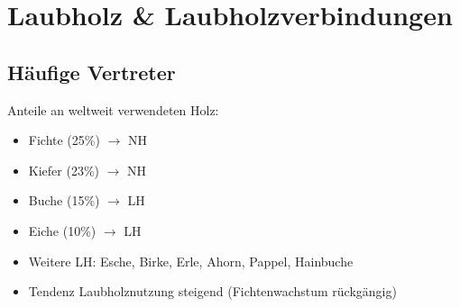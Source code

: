 \documentclass[fleqn,twoside]{article}
\begin{document}
\newpage
\section{Laubholz \& Laubholzverbindungen}

    \subsection{Häufige Vertreter}
        Anteile an weltweit verwendeten Holz:
        \begin{itemize}
            \item Fichte (25\%) $\rightarrow$ NH
            \item Kiefer (23\%) $\rightarrow$ NH
            \item Buche (15\%) $\rightarrow$ LH
            \item Eiche (10\%) $\rightarrow$ LH
            \item Weitere LH: Esche, Birke, Erle, Ahorn, Pappel, Hainbuche
            \item Tendenz Laubholznutzung steigend (Fichtenwachstum rückgängig)
        \end{itemize}
\end{document}
